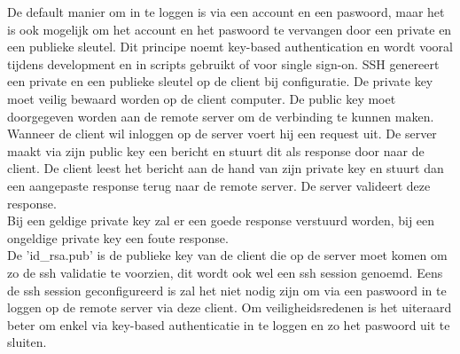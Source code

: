             De default manier om in te loggen is via een account en een paswoord, maar het is ook mogelijk om het account en het paswoord te vervangen door een private en een publieke sleutel. Dit principe noemt key-based authentication en wordt vooral tijdens development en in scripts gebruikt of voor single sign-on. SSH genereert een private en een publieke sleutel op de client bij configuratie. De private key moet veilig bewaard worden op de client computer. De public key moet doorgegeven worden aan de remote server om de verbinding te kunnen maken.\\
            Wanneer de client wil inloggen op de server voert hij een request uit. De server maakt via zijn public key een bericht en stuurt dit als response door naar de client. De client leest het bericht aan de hand van zijn private key en stuurt dan een aangepaste response terug naar de remote server. De server valideert deze response.\\
            Bij een geldige private key zal er een goede response verstuurd worden, bij een ongeldige private key een foute response.
            \\
            De 'id\_rsa.pub' is de publieke key van de client die op de server moet komen om zo de ssh validatie te voorzien, dit wordt ook wel een ssh session genoemd. Eens de ssh session geconfigureerd is zal het niet nodig zijn om via een paswoord in te loggen op de remote server via deze client.
            Om veiligheidsredenen is het uiteraard beter om enkel via key-based authenticatie in te loggen en zo het paswoord uit te sluiten.
